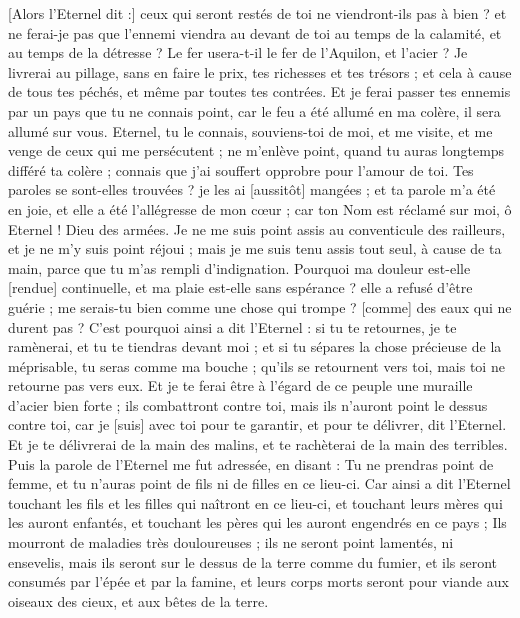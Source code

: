 \begin{multicols}{2}
[Alors l'Eternel dit :] ceux qui seront restés de toi ne viendront-ils pas à bien ? et ne ferai-je pas que l'ennemi viendra au devant de toi au temps de la calamité, et au temps de la détresse ?
Le fer usera-t-il le fer de l'Aquilon, et l'acier ?
Je livrerai au pillage, sans en faire le prix, tes richesses et tes trésors ; et cela à cause de tous tes péchés, et même par toutes tes contrées.
Et je ferai passer tes ennemis par un pays que tu ne connais point, car le feu a été allumé en ma colère, il sera allumé sur vous.
Eternel, tu le connais, souviens-toi de moi, et me visite, et me venge de ceux qui me persécutent ; ne m'enlève point, quand tu auras longtemps différé ta colère ; connais que j'ai souffert opprobre pour l'amour de toi.
Tes paroles se sont-elles trouvées ? je les ai [aussitôt] mangées ; et ta parole m'a été en joie, et elle a été l'allégresse de mon cœur ; car ton Nom est réclamé sur moi, ô Eternel ! Dieu des armées.
Je ne me suis point assis au conventicule des railleurs, et je ne m'y suis point réjoui ; mais je me suis tenu assis tout seul, à cause de ta main, parce que tu m'as rempli d'indignation.
Pourquoi ma douleur est-elle [rendue] continuelle, et ma plaie est-elle sans espérance ? elle a refusé d'être guérie ; me serais-tu bien comme une chose qui trompe ? [comme] des eaux qui ne durent pas ?
C'est pourquoi ainsi a dit l'Eternel : si tu te retournes, je te ramènerai, et tu te tiendras devant moi ; et si tu sépares la chose précieuse de la méprisable, tu seras comme ma bouche ; qu'ils se retournent vers toi, mais toi ne retourne pas vers eux.
Et je te ferai être à l'égard de ce peuple une muraille d'acier bien forte ; ils combattront contre toi, mais ils n'auront point le dessus contre toi, car je [suis] avec toi pour te garantir, et pour te délivrer, dit l'Eternel.
Et je te délivrerai de la main des malins, et te rachèterai de la main des terribles.
\VerseOne{}Puis la parole de l'Eternel me fut adressée, en disant :
Tu ne prendras point de femme, et tu n'auras point de fils ni de filles en ce lieu-ci.
Car ainsi a dit l'Eternel touchant les fils et les filles qui naîtront en ce lieu-ci, et touchant leurs mères qui les auront enfantés, et touchant les pères qui les auront engendrés en ce pays ;
Ils mourront de maladies très douloureuses ; ils ne seront point lamentés, ni ensevelis, mais ils seront sur le dessus de la terre comme du fumier, et ils seront consumés par l'épée et par la famine, et leurs corps morts seront pour viande aux oiseaux des cieux, et aux bêtes de la terre.

\end{multicols}
